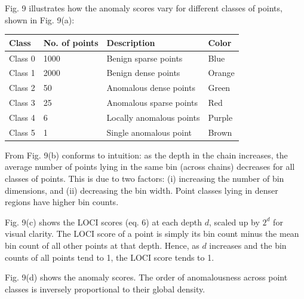 \documentclass[11pt,onecolumn]{article}
\begin{document}
Fig. 9 illustrates how the anomaly scores vary for different classes of points, shown in Fig. 9(a):
\begin{table}[h!]
	\centering
	\begin{tabular}{llll}
		\toprule
		\textbf{Class} & \textbf{No. of points} & \textbf{Description} & \textbf{Color}\\
		\midrule
		Class 0 & 1000 & Benign sparse points & Blue\\
		Class 1 & 2000 & Benign dense points & Orange\\
		Class 2 & 50 & Anomalous dense points & Green\\
		Class 3 & 25 & Anomalous sparse points & Red\\
		Class 4 & 6 & Locally anomalous points & Purple\\
		Class 5 & 1 & Single anomalous point & Brown\\
		\bottomrule
	\end{tabular}
\end{table}

\pagebreak

From Fig. 9(b) conforms to intuition: as the depth in the chain increases, the average number of points lying in the same bin (across chains) decreases for all classes of points. This is due to two factors: (i) increasing the number of bin dimensions, and (ii) decreasing the bin width. Point classes lying in denser regions have higher bin counts.

Fig. 9(c) shows the LOCI scores (eq. 6) at each depth $d$, scaled up by $2^d$ for visual clarity. The LOCI score of a point is simply its bin count minus the mean bin count of all other points at that depth. Hence, as $d$ increases and the bin counts of all points tend to 1, the LOCI score tends to 1.

Fig. 9(d) shows the anomaly scores. The order of anomalousness across point classes is inversely proportional to their global density. %
\end{document}
